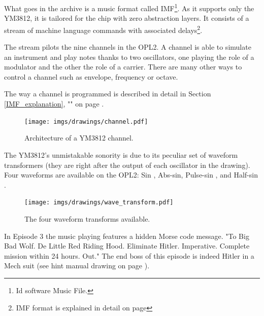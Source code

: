 \documentclass[book.tex]{subfiles}
\begin{document}
What goes in the  archive is a music format called IMF\footnote{Id software Music File.}. As it supports only the YM3812, it is tailored for the chip with zero abstraction layers. It consists of a stream of machine language commands with associated delays\footnote{IMF format is explained in detail on page \pageref{IMF_explanation}}.\\
\par
 The stream pilots the nine channels in the OPL2. A channel is able to simulate an instrument and play notes thanks to two oscillators, one playing the role of a modulator and the other the role of a carrier. There are many other ways to control a channel such as envelope, frequency or octave.\\
\par The way a channel is programmed is described in detail in Section \ref{IMF_explanation}, "" on page \pageref{IMF_explanation}.\\
\par

\pagebreak


\begin{figure}[H]
\centering
 \texttt{[image: imgs/drawings/channel.pdf]}
 \caption{Architecture of a YM3812 channel.}
\end{figure}
\par
{}  The YM3812's unmistakable sonority is due to its peculiar set of waveform transformers (they are right after the output of each oscillator in the drawing). Four waveforms are available on the OPL2: Sin , Abs-sin, Pulse-sin , and Half-sin .
\par
\begin{figure}[H]
\centering
 \texttt{[image: imgs/drawings/wave\_transform.pdf]}
 \caption{The four waveform transforms available.}
\end{figure}


 In Episode 3 the music playing features a hidden Morse code message. "To Big Bad Wolf. De Little Red Riding Hood. Eliminate Hitler. Imperative. Complete mission within 24 hours. Out." The end boss of this episode is indeed Hitler in a Mech suit (see hint manual drawing on page \pageref{hitler_drawing}).
\end{document}
